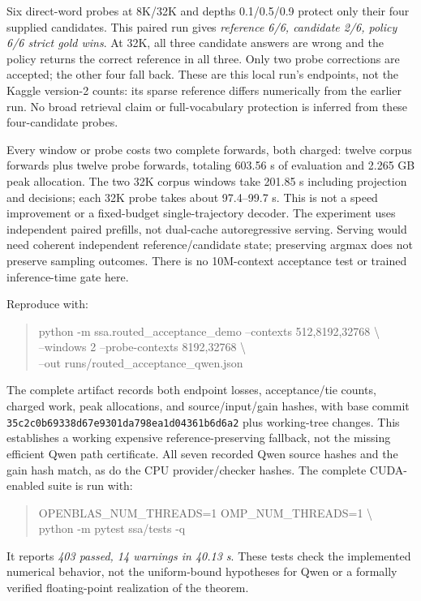 \documentclass[11pt]{article}
\numberwithin{equation}{section}
\begin{document}
Six direct-word probes at 8K/32K and depths 0.1/0.5/0.9 protect only their four supplied candidates.
This paired run gives \emph{reference 6/6, candidate 2/6, policy 6/6 strict gold wins}. At 32K, all three
candidate answers are wrong and the policy returns the correct reference in all three. Only two probe
corrections are accepted; the other four fall back. These are this local run's endpoints, not the Kaggle
version-2 counts: its sparse reference differs numerically from the earlier run. No broad retrieval
claim or full-vocabulary protection is inferred from these four-candidate probes.

Every window or probe costs two complete forwards, both charged: twelve corpus forwards plus twelve
probe forwards, totaling 603.56 s of evaluation and 2.265 GB peak allocation. The two 32K corpus windows
take 201.85 s including projection and decisions; each 32K
probe takes about 97.4--99.7 s. This is not a speed improvement or a fixed-budget single-trajectory
decoder. The experiment uses independent paired prefills, not dual-cache autoregressive serving.
Serving would need coherent independent reference/candidate state; preserving argmax does not preserve
sampling outcomes. There is no 10M-context acceptance test or trained inference-time gate here.

Reproduce with:
\begin{quote}\small\ttfamily\raggedright
python -m ssa.routed\_acceptance\_demo --contexts 512,8192,32768 \textbackslash{}\\
--windows 2 --probe-contexts 8192,32768 \textbackslash{}\\
--out runs/routed\_acceptance\_qwen.json
\end{quote}
The complete artifact records both endpoint losses, acceptance/tie counts, charged work, peak allocations,
and source/input/gain hashes, with base commit
\texttt{35c2c0b69338d67e9301\allowbreak da798ea1d04361b6d6a2} plus working-tree changes. This establishes
a working expensive reference-preserving fallback, not the missing efficient Qwen path certificate.
All seven recorded Qwen source hashes and the gain hash match, as do the CPU provider/checker hashes.
The complete CUDA-enabled suite is run with:
\begin{quote}\small\ttfamily\raggedright
OPENBLAS\_NUM\_THREADS=1 OMP\_NUM\_THREADS=1 \textbackslash{}\\
python -m pytest ssa/tests -q
\end{quote}
It reports \emph{403 passed, 14 warnings in 40.13 s}. These tests check the implemented numerical behavior,
not the uniform-bound hypotheses for Qwen or a formally verified floating-point realization of the theorem.
\end{document}
